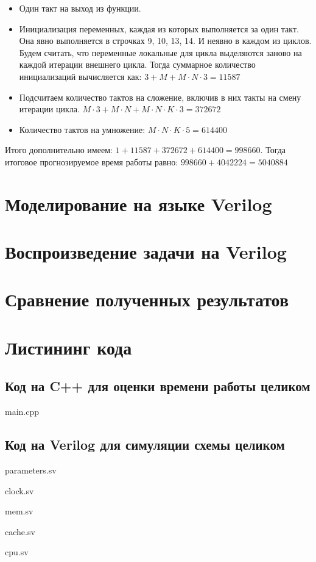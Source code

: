 \documentclass[14pt, russian, onesize]{extreport}
\newenvironment{code}{\captionsetup{type=listing}}{}
\begin{document}
\begin{itemize}
    \item 
        Один такт на выход из функции.
    \item 
        Инициализация переменных, каждая из которых выполняется
        за один такт. Она явно выполняется в строчках 9, 10, 13, 14. 
        И неявно в каждом из циклов. Будем считать, что переменные локальные
        для цикла выделяются заново на каждой итерации внешнего цикла.
        Тогда суммарное количество инициализаций вычисляется как: 
        $3 + M + M \cdot N \cdot 3 = 11587$ 
    \item 
        Подсчитаем количество тактов на сложение, включив в них
        такты на смену итерации цикла. 
        $M \cdot 3+ M \cdot N + M \cdot N \cdot K \cdot 3 = 372672$
    \item 
        Количество тактов на умножение: 
        $M \cdot N \cdot K \cdot 5 = 614400$ 
\end{itemize}
Итого дополнительно имеем: $1 + 11587 + 372672 + 614400 = 998660$.
Тогда итоговое прогнозируемое время работы равно:
$998660 + 4042224 = 5040884$
\section*{ Моделирование на языке Verilog }
\section*{ Воспроизведение задачи на Verilog }
\section*{ Сравнение полученных результатов }
\section*{ Листининг кода }
\subsection*{ Код на C++ для оценки времени работы целиком }
\begin{code}
    \caption{main.cpp}
\end{code}
\subsection*{ Код на Verilog для симуляции схемы целиком }
\begin{code}
    \caption{parameters.sv}
\end{code}
\begin{code}
    \caption{clock.sv}
\end{code}
\begin{code}
    \caption{mem.sv}
\end{code}
\begin{code}
    \caption{cache.sv}
\end{code}
\begin{code}
    \caption{cpu.sv}
\end{code}
\end{document}
